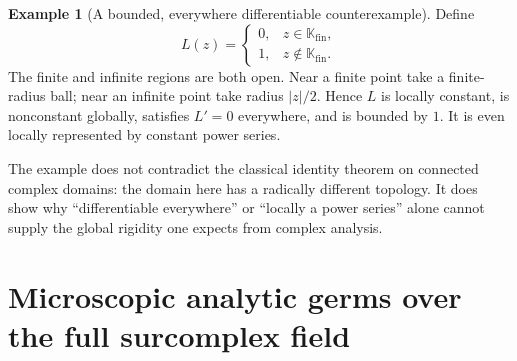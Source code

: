 \documentclass[11pt,oneside]{article}
\theoremstyle{definition}\newtheorem{definition}[theorem]{Definition}
\newtheorem{example}[theorem]{Example}
\newcommand{\K}{\mathbb K}
\newcommand{\Fin}{\K_{\mathrm{fin}}}
\begin{document}
\begin{example}[A bounded, everywhere differentiable counterexample]\label{ex:locconstant}
Define
\[
 L(z)=\begin{cases}0,&z\in\Fin,\\1,&z\notin\Fin.\end{cases}
\]
The finite and infinite regions are both open. Near a finite point take a finite-radius ball; near an infinite point take radius $|z|/2$. Hence $L$ is locally constant, is nonconstant globally, satisfies $L'=0$ everywhere, and is bounded by $1$. It is even locally represented by constant power series.
\end{example}
The example does not contradict the classical identity theorem on connected complex domains: the domain here has a radically different topology. It does show why ``differentiable everywhere'' or ``locally a power series'' alone cannot supply the global rigidity one expects from complex analysis.

\section{Microscopic analytic germs over the full surcomplex field}\label{sec:micro}
\end{document}
